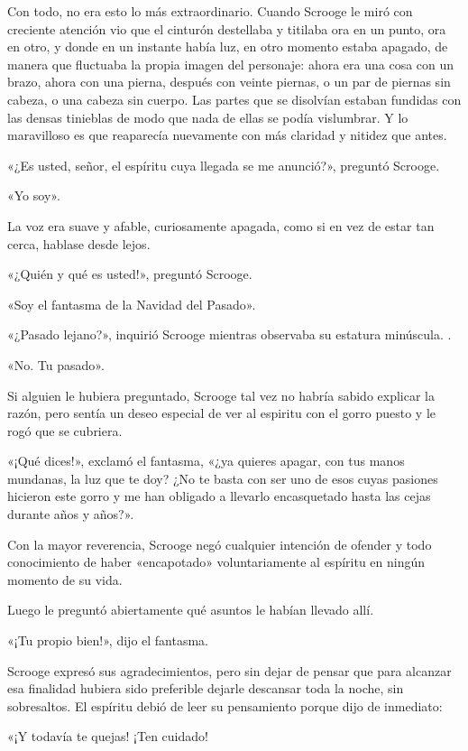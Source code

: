 \documentclass{novela}
\begin{document}
 Con todo, no era esto lo más extraordinario. Cuando Scrooge le miró con creciente atención vio que el cinturón destellaba y titilaba ora en un punto, ora en otro, y donde en un instante había luz, en otro momento estaba apagado, de manera que fluctuaba la propia imagen del personaje: ahora era una cosa con un brazo, ahora con una pierna, después con veinte piernas, o un par de piernas sin cabeza, o una cabeza sin cuerpo. Las partes que se disolvían estaban fundidas con las densas tinieblas de modo que nada de ellas se podía vislumbrar. Y lo maravilloso es que reaparecía nuevamente con más claridad y nitidez que antes.

 «¿Es usted, señor, el espíritu cuya llegada se me anunció?», preguntó Scrooge.

 «Yo soy».

 La voz era suave y afable, curiosamente apagada, como si en vez de estar tan cerca, hablase desde lejos.

 «¿Quién y qué es usted!», preguntó Scrooge.

 «Soy el fantasma de la Navidad del Pasado».

 «¿Pasado lejano?», inquirió Scrooge mientras observaba su estatura minúscula. .

 «No. Tu pasado».

 Si alguien le hubiera preguntado, Scrooge tal vez no habría sabido explicar la razón, pero sentía un deseo especial de ver al espiritu con el gorro puesto y le rogó que se cubriera.

 «¡Qué dices!», exclamó el fantasma, «¿ya quieres apagar, con tus manos mundanas, la luz que te doy? ¿No te basta con ser uno de esos cuyas pasiones hicieron este gorro y me han obligado a llevarlo encasquetado hasta las cejas durante años y años?».

 Con la mayor reverencia, Scrooge negó cualquier intención de ofender y todo conocimiento de haber «encapotado» voluntariamente al espíritu en ningún momento de su vida.

 Luego le preguntó abiertamente qué asuntos le habían llevado allí.

 «¡Tu propio bien!», dijo el fantasma.

 Scrooge expresó sus agradecimientos, pero sin dejar de pensar que para alcanzar esa finalidad hubiera sido preferible dejarle descansar toda la noche, sin sobresaltos. El espíritu debió de leer su pensamiento porque dijo de inmediato:

 «¡Y todavía te quejas! ¡Ten cuidado!
\end{document}
